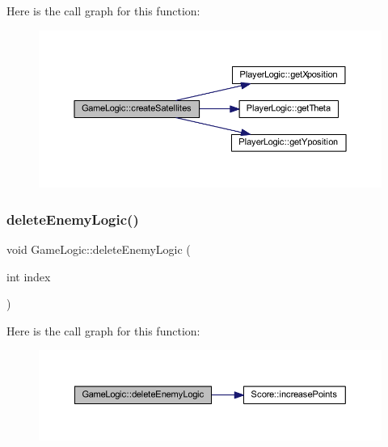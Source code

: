 Here is the call graph for this function\+:
\nopagebreak
\begin{figure}[H]
\begin{center}
\leavevmode
\includegraphics[width=350pt]{class_game_logic_ab2b56581a56239bb837e6eeea0a2991d_cgraph}
\end{center}
\end{figure}
\mbox{\label{class_game_logic_a34fd5f74aec0365dff0631384740a45b}} 
\subsubsection{\texorpdfstring{delete\+Enemy\+Logic()}{deleteEnemyLogic()}}
{\footnotesize\ttfamily void Game\+Logic\+::delete\+Enemy\+Logic (\begin{DoxyParamCaption}\item[{int}]{index }\end{DoxyParamCaption})}

Here is the call graph for this function\+:
\nopagebreak
\begin{figure}[H]
\begin{center}
\leavevmode
\includegraphics[width=350pt]{class_game_logic_a34fd5f74aec0365dff0631384740a45b_cgraph}
\end{center}
\end{figure}
\mbox{\label{class_game_logic_adc970904cd9d94e6e64b733863839ddf}} 
